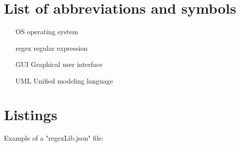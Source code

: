 \documentclass[a4paper,twoside,12pt]{book}
\begin{document}
\begin{appendices} 


 

\chapter*{List of abbreviations and symbols}

\begin{itemize}
\item[OS] operating system
\item[regex] regular expression
\item[GUI] Graphical user interface
\item[UML] Unified modeling language 
\end{itemize}


\chapter*{Listings}

   
Example of a "regexLib.json" file:


\end{appendices}
\end{document}
